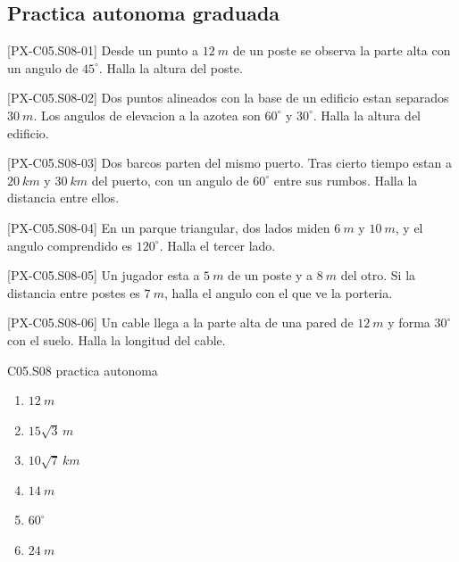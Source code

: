 \subsection*{Practica autonoma graduada}
\begin{exercise}{[PX-C05.S08-01] Desde un punto a \(\SI{12}{m}\) de un poste se observa la parte alta con un angulo de \(45^\circ\). Halla la altura del poste.}
\end{exercise}
\begin{exercise}{[PX-C05.S08-02] Dos puntos alineados con la base de un edificio estan separados \(\SI{30}{m}\). Los angulos de elevacion a la azotea son \(60^\circ\) y \(30^\circ\). Halla la altura del edificio.}
\end{exercise}
\begin{exercise}{[PX-C05.S08-03] Dos barcos parten del mismo puerto. Tras cierto tiempo estan a \(\SI{20}{km}\) y \(\SI{30}{km}\) del puerto, con un angulo de \(60^\circ\) entre sus rumbos. Halla la distancia entre ellos.}
\end{exercise}
\begin{exercise}{[PX-C05.S08-04] En un parque triangular, dos lados miden \(\SI{6}{m}\) y \(\SI{10}{m}\), y el angulo comprendido es \(120^\circ\). Halla el tercer lado.}
\end{exercise}
\begin{exercise}{[PX-C05.S08-05] Un jugador esta a \(\SI{5}{m}\) de un poste y a \(\SI{8}{m}\) del otro. Si la distancia entre postes es \(\SI{7}{m}\), halla el angulo con el que ve la porteria.}
\end{exercise}
\begin{exercise}{[PX-C05.S08-06] Un cable llega a la parte alta de una pared de \(\SI{12}{m}\) y forma \(30^\circ\) con el suelo. Halla la longitud del cable.}
\end{exercise}

\begin{shortanswer}{C05.S08 practica autonoma}
\begin{enumerate}[label=\textbf{PX-C05.S08-\arabic*:}, leftmargin=*]
  \item \(\SI{12}{m}\)
  \item \(15\sqrt{3}\,\si{m}\)
  \item \(10\sqrt{7}\,\si{km}\)
  \item \(\SI{14}{m}\)
  \item \(60^\circ\)
  \item \(\SI{24}{m}\)
\end{enumerate}
\end{shortanswer}

